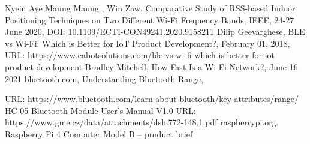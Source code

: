 \documentclass[12pt, twoside, openany]{mwrep}
\begin{document}
\begin{thebibliography}{99}
\bibitem[18]{} Nyein Aye Maung Maung , Win Zaw, Comparative Study of RSS-based Indoor Positioning Techniques on Two Different Wi-Fi Frequency Bands, IEEE, 24-27 June 2020, DOI: 10.1109/ECTI-CON49241.2020.9158211
\bibitem[19]{} Dilip Geevarghese, BLE vs Wi-Fi: Which is Better for IoT Product Development?, February 01, 2018, URL:  https://www.cabotsolutions.com/ble-vs-wi-fi-which-is-better-for-iot-product-development
\bibitem[20]{} Bradley Mitchell, How Fast Is a Wi-Fi Network?, June 16 2021
\bibitem[21]{} bluetooth.com, Understanding Bluetooth Range, \par URL: https://www.bluetooth.com/learn-about-bluetooth/key-attributes/range/
\bibitem[22]{} HC-05 Bluetooth Module User’s Manual V1.0 URL: https://www.gme.cz/data/attachments/dsh.772-148.1.pdf
\bibitem[23]{} raspberrypi.org, Raspberry Pi 4 Computer Model B – product brief
\end{thebibliography}

\listoffigures

\listoftables

\listofalgorithms
\end{document}

